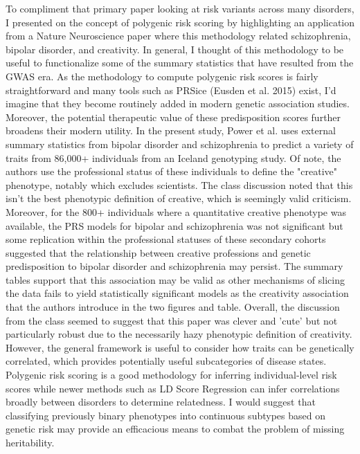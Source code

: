 \documentclass[12pt]{article}
\begin{document}
\begin{addmargin}[6.5mm]{4mm}
To compliment that primary paper looking at risk variants across many disorders, I presented on the concept of polygenic risk scoring by highlighting an application from a Nature Neuroscience paper where this methodology related schizophrenia, bipolar disorder, and creativity. In general, I thought of this methodology to be useful to functionalize some of the summary statistics that have resulted from the GWAS era. As the methodology to compute polygenic risk scores is fairly straightforward and many tools such as PRSice (Eusden et al. 2015) exist, I'd imagine that they become routinely added in modern genetic association studies. Moreover, the potential therapeutic value of these predisposition scores further broadens their modern utility. \newline \newline In the present study, Power et al. uses external summary statistics from bipolar disorder and schizophrenia to predict a variety of traits from 86,000+ individuals from an Iceland genotyping study. Of note, the authors use the professional status of these individuals to define the "creative" phenotype, notably which excludes scientists. The class discussion noted that this isn't the best phenotypic definition of creative, which is seemingly valid criticism. Moreover, for the 800+ individuals where a quantitative creative phenotype was available, the PRS models for bipolar and schizophrenia was not significant but some replication within the professional statuses of these secondary cohorts suggested that the relationship between creative professions and genetic predisposition to bipolar disorder and schizophrenia may persist. The summary tables support that this association may be valid as other mechanisms of slicing the data fails to yield statistically significant models as the creativity association that the authors introduce in the two figures and table. \newline \newline Overall, the discussion from the class seemed to suggest that this paper was clever and 'cute' but not particularly robust due to the necessarily hazy phenotypic definition of creativity. However, the general framework is useful to consider how traits can be genetically correlated, which provides potentially useful subcategories of disease states. Polygenic risk scoring is a good methodology for inferring individual-level risk scores while newer methods such as LD Score Regression can infer correlations broadly between disorders to determine relatedness. I would suggest that classifying previously binary phenotypes into continuous subtypes based on genetic risk may provide an efficacious means to combat the problem of missing heritability.  
\end{addmargin}
\end{document}
